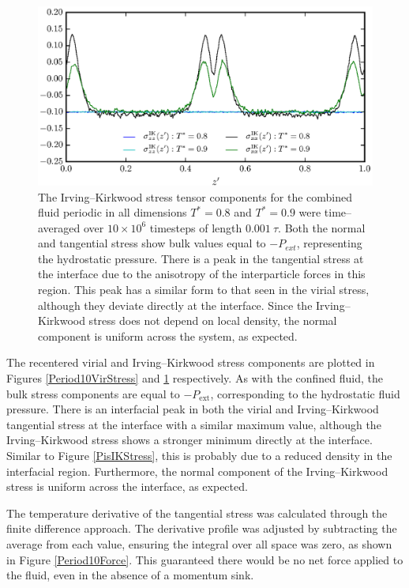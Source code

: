 \begin{figure}[h!]
\centering
\includegraphics[scale=1.0]{Period10IKStress}
\caption{The Irving--Kirkwood stress tensor components for the combined fluid periodic in all dimensions $T^{*} = 0.8$ and $T^{*} = 0.9$ were time--averaged over $10 \times 10^{6}$ timesteps of length $0.001\ \tau$.
Both the normal and tangential stress show bulk values equal to $-P_{ext}$, representing the hydrostatic pressure.
There is a peak in the tangential stress at the interface due to the anisotropy of the interparticle forces in this region.
This peak has a similar form to that seen in the virial stress, although they deviate directly at the interface.
Since the Irving--Kirkwood stress does not depend on local density, the normal component is uniform across the system, as expected.
}
\label{Period10IKStress}
\end{figure}
The recentered virial and Irving--Kirkwood stress components are plotted in Figures \ref{Period10VirStress} and \ref{Period10IKStress} respectively.
As with the confined fluid, the bulk stress components are equal to $-P_{\mathrm{ext}}$, corresponding to the hydrostatic fluid pressure.
There is an interfacial peak in both the virial and Irving--Kirkwood tangential stress at the interface with a similar maximum value, although the Irving--Kirkwood stress shows a stronger minimum directly at the interface.
Similar to Figure \ref{PisIKStress}, this is probably due to a reduced density in the interfacial region.
Furthermore, the normal component of the Irving--Kirkwood stress is uniform across the interface, as expected.

The temperature derivative of the tangential stress was calculated through the finite difference approach.
The derivative profile was adjusted by subtracting the average from each value, ensuring the integral over all space was zero, as shown in Figure \ref{Period10Force}.
This guaranteed there would be no net force applied to the fluid, even in the absence of a momentum sink.
\FloatBarrier

